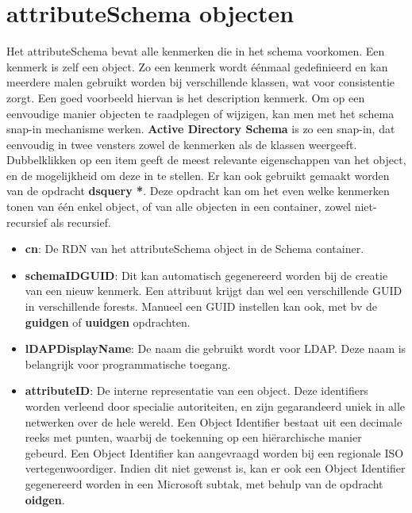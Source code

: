 	\section{attributeSchema objecten }
	\begin{enumerate}
		 { 
			Het attributeSchema bevat alle kenmerken die in het schema voorkomen. Een kenmerk is zelf een object. Zo een kenmerk wordt éénmaal gedefinieerd en kan meerdere malen gebruikt worden bij verschillende klassen, wat voor consistentie zorgt. Een goed voorbeeld hiervan is het description kenmerk. Om op een eenvoudige manier objecten te raadplegen of wijzigen, kan men met het schema snap-in mechanisme werken. \textbf{Active Directory Schema} is zo een snap-in, dat eenvoudig in twee vensters zowel de kenmerken als de klassen weergeeft. Dubbelklikken op een item geeft de meest relevante eigenschappen van het object, en de mogelijkheid om deze in te stellen. Er kan ook gebruikt gemaakt worden van de opdracht \textbf{dsquery *}. Deze opdracht kan om het even welke kenmerken tonen van één enkel object, of van alle objecten in een container, zowel niet-recursief als recursief.

		}
		
		 { 
			\begin{itemize}
				\item \textbf{cn}: De RDN van het attributeSchema object in de Schema container.
				\item \textbf{schemaIDGUID}: Dit kan automatisch gegenereerd worden bij de creatie van een nieuw kenmerk. Een attribuut krijgt dan wel een verschillende GUID in verschillende forests. Manueel een GUID instellen kan ook, met bv de \textbf{guidgen} of \textbf{uuidgen} opdrachten.
				\item \textbf{lDAPDisplayName}: De naam die gebruikt wordt voor LDAP. Deze naam is belangrijk voor programmatische toegang.
				\item \textbf{attributeID}: De interne representatie van een object. Deze identifiers worden verleend door specialie autoriteiten, en zijn gegarandeerd uniek in alle netwerken over de hele wereld. Een Object Identifier bestaat uit een decimale reeks met punten, waarbij de toekenning op een hiërarchische manier gebeurd. Een Object Identifier kan aangevraagd worden bij een regionale ISO vertegenwoordiger. Indien dit niet gewenst is, kan er ook een Object Identifier gegenereerd worden in een Microsoft subtak, met behulp van de opdracht \textbf{oidgen}.
			\end{itemize}
		}
		

\end{enumerate}
